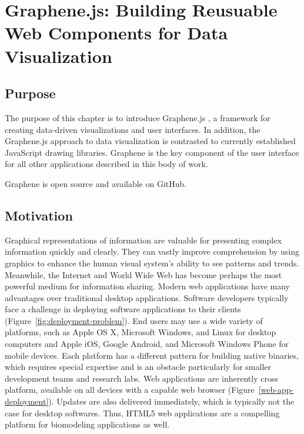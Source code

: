\chapter{Graphene.js: Building Reusuable Web Components for Data Visualization}

\section{Purpose}

The purpose of this chapter is to introduce Graphene.js \autocite{gu2014graphene}, a framework for creating data-driven visualizations and user interfaces.
In addition, the Graphene.js approach to data visualization is contrasted to currently established JavaScript drawing libraries.
Graphene is the key component of the user interface for all other applications described in this body of work.

Graphene is open source and available on GitHub.

\section{Motivation}

Graphical representations of information are valuable for presenting complex information quickly and clearly. \autocite{newsom2007public, smiciklas2012power}
They can vastly improve comprehension by using graphics to enhance the human visual system’s ability to see patterns and trends. \autocite{heer2010tour, sears2007human}
Meanwhile, the Internet and World Wide Web \autocite{berners2000weaving} has become perhaps the most powerful medium for information sharing. \autocite{bollacker1998citeseer, wilkinson2003motivations, page1999pagerank}
Modern web applications have many advantages over traditional desktop applications.
Software developers typically face a challenge in deploying software applications to their clients (Figure~\ref{fig:deployment-problem}).
End users may use a wide variety of platforms, such as Apple OS X, Microsoft Windows, and Linux for desktop computers and Apple iOS, Google Android, and Microsoft Windows Phone for mobile devices.
Each platform has a different pattern for building native binaries, which requires special expertise and is an obstacle particularly for smaller development teams and research labs.
Web applications are inherently cross platform, available on all devices with a capable web browser (Figure~\ref{web-app-deployment}).
Updates are also delivered immediately, which is typically not the case for desktop softwares.
Thus, HTML5 web applications are a compelling platform for biomodeling applications as well.

